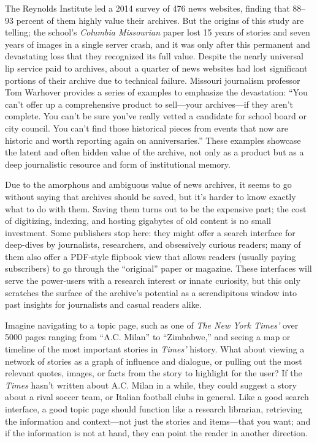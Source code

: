 The Reynolds Institute led a 2014 survey of 476 news websites, finding that 88--93 percent of them highly value their archives. But the origins of this study are telling; the school's \emph{Columbia Missourian} paper lost 15 years of stories and seven years of images in a single server crash, and it was only after this permanent and devastating loss that they recognized its full value. Despite the nearly universal lip service paid to archives, about a quarter of news websites had lost significant portions of their archive due to technical failure. Missouri journalism professor Tom Warhover provides a series of examples to emphasize the devastation: ``You can't offer up a comprehensive product to sell---your archives---if they aren't complete. You can't be sure you've really vetted a candidate for school board or city council. You can't find those historical pieces from events that now are historic and worth reporting again on anniversaries.''\autocite{mccain_saving_2014} These examples showcase the latent and often hidden value of the archive, not only as a product but as a deep journalistic resource and form of institutional memory.

Due to the amorphous and ambiguous value of news archives, it seems to go without saying that archives should be saved, but it's harder to know exactly what to do with them. Saving them turns out to be the expensive part; the cost of digitizing, indexing, and hosting gigabytes of old content is no small investment. Some publishers stop here: they might offer a search interface for deep-dives by journalists, researchers, and obsessively curious readers; many of them also offer a PDF-style flipbook view that allows readers (usually paying subscribers) to go through the ``original'' paper or magazine. These interfaces will serve the power-users with a research interest or innate curiosity, but this only scratches the surface of the archive's potential as a serendipitous window into past insights for journalists and casual readers alike.

Imagine navigating to a topic page, such as one of \emph{The New York Times'} over 5000 pages ranging from ``A.C. Milan'' to ``Zimbabwe,'' and seeing a map or timeline of the most important stories in \emph{Times'} history. What about viewing a network of stories as a graph of influence and dialogue, or pulling out the most relevant quotes, images, or facts from the story to highlight for the user? If the \emph{Times} hasn't written about A.C. Milan in a while, they could suggest a story about a rival soccer team, or Italian football clubs in general. Like a good search interface, a good topic page should function like a research librarian, retrieving the information and context---not just the stories and items---that you want; and if the information is not at hand, they can point the reader in another direction.

